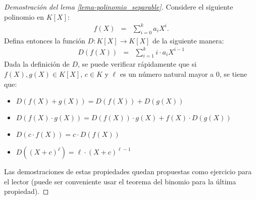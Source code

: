 \documentclass[10pt]{article}
\newcommand{\0}{\mathbf{0}}
\newcommand{\1}{\mathbf{1}}
\newcommand{\+}{\oplus}
\theoremstyle{remark}
\theoremstyle{remark}
\begin{document}
\begin{proof}[Demostración del lema \ref{lema-polinomio_separable}]
  Considere el siguiente polinomio en $K[X]$:
  \begin{eqnarray*}
    f(X) & = & \sum_{i=0}^{k} a_iX^i.
  \end{eqnarray*}
  Defina entonces la función
  $D:K[X] \to K[X]$ de la siguiente manera:
\begin{eqnarray*}
	D(f(X)) &=& \sum_{i=1}^{k}i\cdot a_i X^{i-1}
\end{eqnarray*}
Dada la definición de $D$, se puede verificar rápidamente que si $f(X),g(X)\in K[X]$, $c\in K$ y $\ell$ es un número natural mayor a 0, se tiene que:
\begin{itemize}
	\item $D(f(X)+g(X)) = D(f(X)) + D(g(X))$
	\item $D(f(X) \cdot g(X)) = D(f(X)) \cdot g(X) + f(X) \cdot D(g(X))$
	\item $D(c\cdot f(X)) = c\cdot D(f(X))$
	\item $D((X+c)^{\ell}) = \ell\cdot(X+c)^{\ell -1}$
\end{itemize}
Las demostraciones de estas propiedades quedan propuestas como
ejercicio para el lector (puede ser conveniente usar el teorema del
binomio para la última propiedad).


\end{proof}
\end{document}
